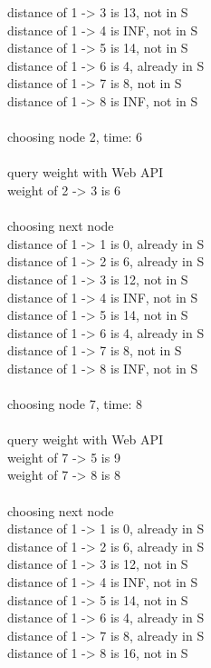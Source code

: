 \documentclass[14pt, a4paper]{article}
\begin{document}
\begin{enumerate}
\begin{enumerate}[label*=\arabic*]
\begin{tcolorbox}[enhanced jigsaw,breakable,pad at break*=1mm,colback=gray!10!white,frame hidden]
distance of 1 -> 3 is 13, not in S\\
distance of 1 -> 4 is INF, not in S\\
distance of 1 -> 5 is 14, not in S\\
distance of 1 -> 6 is 4, already in S\\
distance of 1 -> 7 is 8, not in S\\
distance of 1 -> 8 is INF, not in S\\
\\
choosing node 2, time: 6\\
\\
query weight with Web API\\
weight of 2 -> 3 is 6\\
\\
choosing next node\\
distance of 1 -> 1 is 0, already in S\\
distance of 1 -> 2 is 6, already in S\\
distance of 1 -> 3 is 12, not in S\\
distance of 1 -> 4 is INF, not in S\\
distance of 1 -> 5 is 14, not in S\\
distance of 1 -> 6 is 4, already in S\\
distance of 1 -> 7 is 8, not in S\\
distance of 1 -> 8 is INF, not in S\\
\\
choosing node 7, time: 8\\
\\
query weight with Web API\\
weight of 7 -> 5 is 9\\
weight of 7 -> 8 is 8\\
\\
choosing next node\\
distance of 1 -> 1 is 0, already in S\\
distance of 1 -> 2 is 6, already in S\\
distance of 1 -> 3 is 12, not in S\\
distance of 1 -> 4 is INF, not in S\\
distance of 1 -> 5 is 14, not in S\\
distance of 1 -> 6 is 4, already in S\\
distance of 1 -> 7 is 8, already in S\\
distance of 1 -> 8 is 16, not in S\\
\\

\end{tcolorbox}
\end{enumerate}
\end{enumerate}
\end{document}
